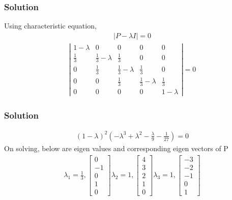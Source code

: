 \documentclass{beamer}
\begin{document}
\begin{frame}
\frametitle{Solution} 
Using characteristic equation,
\begin{align}
    |P-\lambda I|=0
\end{align}
\begin{align}
    \left|\begin{array}{ccccc}1 - \lambda & 0 & 0 & 0 & 0\\\frac{1}{3} & \frac{1}{3} - \lambda & \frac{1}{3} & 0 & 0\\0 & \frac{1}{3} & \frac{1}{3} - \lambda & \frac{1}{3} & 0\\0 & 0 & \frac{1}{3} & \frac{1}{3} - \lambda & \frac{1}{3}\\0 & 0 & 0 & 0 & 1 - \lambda\end{array}\right| = 0
\end{align}
\end{frame}

\begin{frame}
\frametitle{Solution}
\begin{align}
\left(1-\lambda\right)^{2} \left(- \lambda^{3} + \lambda^{2} - \frac{\lambda}{9} - \frac{1}{27}\right) = 0
\end{align}
On solving, below are eigen values and corresponding eigen vectors of P
\begin{align}
\lambda_{1} = \frac{1}{3}, \left[\begin{array}{c}0\\-1\\0\\1\\0\end{array}\right] 
\lambda_{2} = 1, \left[\begin{array}{c}4\\3\\2\\1\\0\end{array}\right] \lambda_{3}=1,\left[\begin{array}{c}-3\\-2\\-1\\0\\1\end{array}\right]
\end{align}
\end{frame}
\end{document}
